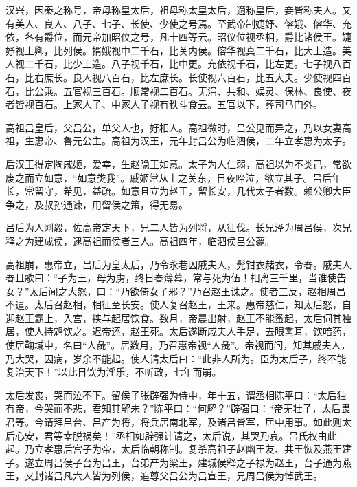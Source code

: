 \documentclass[12pt,UTF8]{ctexbook}
\begin{document}
汉兴，因秦之称号，帝母称皇太后，祖母称太皇太后，適称皇后，妾皆称夫人。又有美人、良人、八子、七子、长使、少使之号焉。至武帝制婕妤、傛娥、傛华、充依，各有爵位，而元帝加昭仪之号，凡十四等云。昭仪位视丞相，爵比诸侯王。婕妤视上卿，比列侯。揟娥视中二千石，比关内侯。傛华视真二千石，比大上造。美人视二千石，比少上造。八子视千石，比中更。充依视千石，比左更。七子视八百石，比右庶长。良人视八百石，比左庶长。长使视六百石，比五大夫。少使视四百石，比公乘。五官视三百石。顺常视二百石。无涓、共和、娱灵、保林、良使、夜者皆视百石。上家人子、中家人子视有秩斗食云。五官以下，葬司马门外。



高祖吕皇后，父吕公，单父人也，好相人。高祖微时，吕公见而异之，乃以女妻高祖，生惠帝、鲁元公主。高祖为汉王，元年封吕公为临泗侯，二年立孝惠为太子。



后汉王得定陶戚姬，爱幸，生赵隐王如意。太子为人仁弱，高祖以为不类己，常欲废之而立如意，“如意类我”。戚姬常从上之关东，日夜啼泣，欲立其子。吕后年长，常留守，希见，益疏。如意且立为赵王，留长安，几代太子者数。赖公卿大臣争之，及叔孙通谏，用留侯之策，得无易。



吕后为人刚毅，佐高帝定天下，兄二人皆为列将，从征伐。长兄泽为周吕侯，次兄释之为建成侯，逮高祖而侯者三人。高祖四年，临泗侯吕公薨。



高祖崩，惠帝立，吕后为皇太后，乃令永巷囚戚夫人，髡钳衣赭衣，令舂。戚夫人舂且歌曰：“子为王，母为虏，终日舂薄幕，常与死为伍！相离三千里，当谁使告女？”太后闻之大怒，曰：“乃欲倚女子邪？”乃召赵王诛之。使者三反，赵相周昌不遣。太后召赵相，相征至长安。使人复召赵王，王来。惠帝慈仁，知太后怒，自迎赵王霸上，入宫，挟与起居饮食。数月，帝晨出射，赵王不能蚤起，太后伺其独居，使人持鸩饮之。迟帝还，赵王死。太后遂断戚夫人手足，去眼熏耳，饮喑药，使居鞠域中，名曰“人彘”。居数月，乃召惠帝视“人彘”。帝视而问，知其戚夫人，乃大哭，因病，岁余不能起。使人请太后曰：“此非人所为。臣为太后子，终不能复治天下！”以此日饮为淫乐，不听政，七年而崩。



太后发丧，哭而泣不下。留侯子张辟强为侍中，年十五，谓丞相陈平曰：“太后独有帝，今哭而不悲，君知其解未？”陈平曰：“何解？”辟强曰：“帝无壮子，太后畏君等。今请拜吕台、吕产为将，将兵居南北军，及诸吕皆军，居中用事。如此则太后心安，君等幸脱祸矣！”丞相如辟强计请之，太后说，其哭乃哀。吕氏权由此起。乃立孝惠后宫子为帝，太后临朝称制。复杀高祖子赵幽王友、共王恢及燕王建子。遂立周吕侯子台为吕王，台弟产为梁王，建城侯释之子禄为赵王，台子通为燕王，又封诸吕凡六人皆为列侯，追尊父吕公为吕宣王，兄周吕侯为悼武王。
\end{document}
